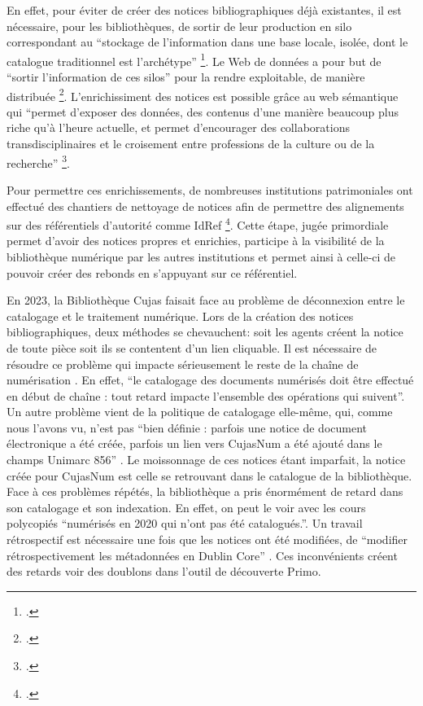 En effet, pour éviter de créer des notices bibliographiques déjà existantes, il est nécessaire, pour les bibliothèques, de sortir de leur production en silo correspondant au \enquote{stockage de l'information dans une base locale, isolée, dont le catalogue traditionnel est l'archétype} \footcite{bernonLierBasesLocales2017}. Le Web de données a pour but de \enquote{sortir l'information de ces silos} pour la rendre exploitable, de manière distribuée \footcite{bermesWebSemantiqueBibliotheque2013}. L'enrichissiment des notices est possible grâce au web sémantique qui \enquote{permet d'exposer des données, des contenus d'une manière beaucoup plus riche qu'à l'heure actuelle, et permet d'encourager des collaborations transdisciplinaires et le croisement entre professions de la culture ou de la recherche} \footcite{melhemUsagesApplicationsWeb}. 

Pour permettre ces enrichissements, de nombreuses institutions patrimoniales ont effectué des chantiers de nettoyage de notices afin de permettre des alignements sur des référentiels d'autorité comme IdRef \footcite{nicolasAtomesCrochusMetadonnees2016}. Cette étape, jugée primordiale permet d'avoir des notices propres et enrichies, participe à la visibilité de la bibliothèque numérique par les autres institutions et permet ainsi à celle-ci de pouvoir créer des rebonds en s'appuyant sur ce référentiel. 

En 2023, la Bibliothèque Cujas faisait face au problème de déconnexion entre le catalogage et le traitement numérique. Lors de la création des notices bibliographiques, deux méthodes se chevauchent: soit les agents créent la notice de toute pièce soit ils se contentent d'un lien cliquable. Il est nécessaire de résoudre ce problème qui impacte sérieusement le reste de la chaîne de numérisation . En effet, \enquote{le catalogage des documents numérisés doit être effectué en début de chaîne : tout retard impacte l'ensemble des opérations qui suivent}. Un autre problème vient de la politique de catalogage elle-même, qui, comme nous l'avons vu, n'est pas \enquote{bien définie : parfois une notice de document électronique a été créée, parfois un lien vers CujasNum a été ajouté dans le champs Unimarc 856} . Le moissonnage de ces notices étant imparfait, la notice créée pour CujasNum est celle se retrouvant dans le catalogue de la bibliothèque. Face à ces problèmes répétés, la bibliothèque a pris énormément de retard dans son catalogage et son indexation. En effet, on peut le voir avec les cours polycopiés \enquote{numérisés en 2020 qui n'ont pas été catalogués.}. Un travail rétrospectif est nécessaire une fois que les notices ont été modifiées, de \enquote{modifier rétrospectivement les métadonnées en Dublin Core} . Ces inconvénients créent des retards voir des doublons dans l'outil de découverte Primo. 

